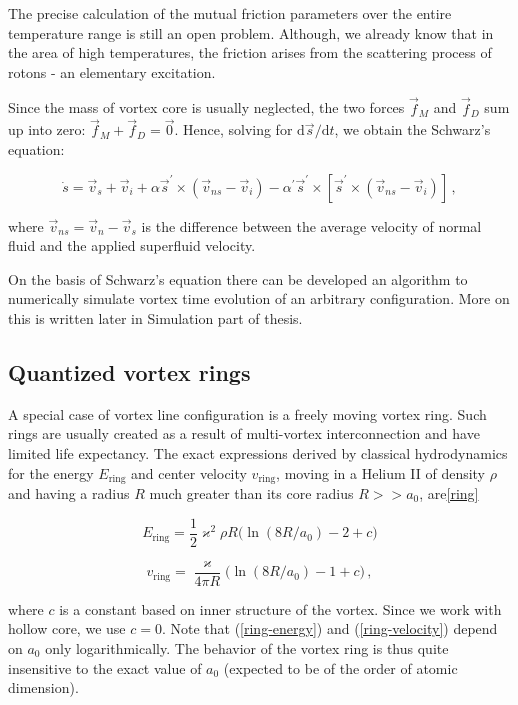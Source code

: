 The precise calculation of the mutual friction parameters over the entire temperature range is still an open problem. Although, we already know that in the area of high temperatures, the friction arises from the scattering process of rotons - an elementary excitation.

Since the mass of vortex core is usually neglected, the two forces $\vec{f}_M$ and $\vec{f}_D$ sum up into zero: $\vec{f}_M + \vec{f}_D = \vec{0}$. Hence, solving for $\text{d}\vec{s} / \text{d} t$, we obtain the Schwarz's equation:

\begin{equation}
\dot{s} = \vec{v}_s + \vec{v}_i
+ \alpha\vec{s}^{\prime} \times (\vec{v}_{ns} - \vec{v}_i)
- \alpha^{\prime}\vec{s}^{\prime} \times [\vec{s}^{\prime} \times (\vec{v}_{ns} - \vec{v}_i)]\,,
\label{schwarz}
\end{equation}

where $\vec{v}_{ns} = \vec{v}_n - \vec{v}_s$ is the difference between the average velocity of normal fluid and the applied superfluid velocity.

On the basis of Schwarz's equation there can be developed an algorithm to numerically simulate vortex time evolution of an arbitrary configuration. More on this is written later in Simulation part of thesis.

\subsection*{Quantized vortex rings}

A special case of vortex line configuration is a freely moving vortex ring. Such rings are usually created as a result of multi-vortex interconnection and have limited life expectancy. The exact expressions derived by classical hydrodynamics for the energy $E_{\text{ring}}$ and center velocity $v_{\text{ring}}$, moving in a Helium II of density $\rho$ and having a radius $R$ much greater than its core radius $R >> a_0$, are\ref{ring}

\begin{equation}
E_{\text{ring}} = \frac{1}{2}\varkappa^2 \rho R \Big(\ln(8R/a_0) - 2 + c\Big)
\label{ring-energy}
\end{equation}

\begin{equation}
v_{\text{ring}} = \frac{\varkappa}{4\pi R} \Big(\ln(8R/a_0) - 1 + c\Big)\,,
\label{ring-velocity}
\end{equation}

where $c$ is a constant based on inner structure of the vortex. Since we work with hollow core, we use
$c = 0$. Note that (\ref{ring-energy}) and (\ref{ring-velocity}) depend on $a_0$ only logarithmically.
The behavior of the vortex ring is thus quite insensitive to the exact value of $a_0$ (expected to be of the order of atomic dimension).

